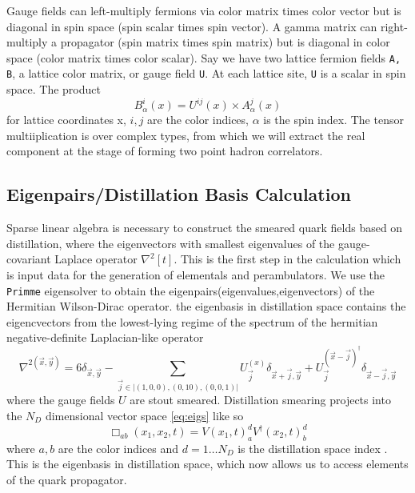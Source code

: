   Gauge fields can left-multiply fermions via color matrix times color
  vector but is diagonal in spin space (spin scalar times spin vector).
  A gamma matrix can right-multiply a propagator (spin matrix times
  spin matrix) but is diagonal in color space (color matrix times color
  scalar). Say we have two lattice fermion fields \texttt{A, B}, a lattice color matrix, or gauge field \texttt{U}. At each lattice site, \texttt{U} is a scalar in spin space. The product 
  \begin{equation}
    B_\alpha^i (x) = U^{ij}(x) \times A_\alpha^j(x)
  \end{equation} for lattice coordinates x, $i,j$ are the color indices, $\alpha$ is the spin index. The tensor multiiplication is over complex types, from which we will extract the real component at the stage of forming two point hadron correlators.  

  
\subsection{Eigenpairs/Distillation Basis Calculation}
Sparse linear algebra is necessary to construct the smeared quark fields based on distillation, where the
eigenvectors with smallest eigenvalues of the gauge-covariant Laplace operator $\nabla^2[t]$. 
This is the first step in the calculation which is input data for the generation of elementals and perambulators. We use the \verb|Primme| eigensolver to obtain the eigenpairs(eigenvalues,eigenvectors) of the Hermitian Wilson-Dirac operator\cite{PRIMME}\cite{Frommer:2020ovr}. 
the eigenbasis in distillation space contains the eigencvectors from the lowest-lying regime of the spectrum of the hermitian negative-definite Laplacian-like operator 
\begin{equation}
  \nabla^{2(\vec{x},\vec{y})} = 6\delta_{\vec{x},\vec{y}} - \sum_{\vec{j}\in|(1,0,0),(0,10),(0,0,1)|}^{} U_{\vec{j}}^{(x)}\delta_{\vec{x}+\vec{j},\vec{y}} + U_{\vec{j}}^{(\vec{x}-\vec{j})^\dagger}\delta_{\vec{x}-\vec{j},\vec{y}}
\end{equation}
where the gauge fields $U$ are stout smeared. 
Distillation smearing projects into the $N_D$ dimensional vector space \ref{eq:eigs} like so 
\begin{equation}
  \Box_{ab}(x_1,x_2,t) = V(x_1,t)^{d}_a V^{\dagger} (x_2,t)^{d}_b
\end{equation} where $a,b$ are the color indices and $d = 1 \dots N_D$ is the distillation space index \cite{10.5555/3029317}. This is the eigenbasis in distillation space, which now allows us to access elements of the quark propagator.  

